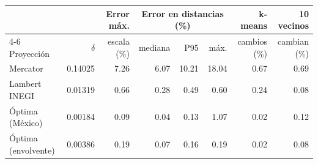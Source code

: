 \begin{tabular}{lrrrrrrr}
\toprule
 & & Error máx. & \multicolumn{3}{c}{Error en distancias (\%)} & k-means & 10 vecinos \\
\cmidrule(lr){4-6}
Proyección & $\delta$ & escala (\%) & mediana & P95 & máx. & cambios (\%) & cambian (\%) \\
\midrule
Mercator & 0.14025 & 7.26 & 6.07 & 10.21 & 18.04 & 0.67 & 0.69 \\
Lambert INEGI & 0.01319 & 0.66 & 0.28 & 0.49 & 0.60 & 0.24 & 0.08 \\
Óptima (México) & 0.00184 & 0.09 & 0.04 & 0.13 & 1.07 & 0.02 & 0.12 \\
Óptima (envolvente) & 0.00386 & 0.19 & 0.07 & 0.16 & 0.19 & 0.02 & 0.08 \\
\bottomrule
\end{tabular}
